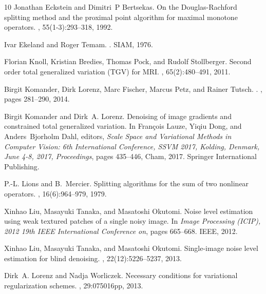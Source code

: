 \documentclass[twocolumn,envcountsame]{svjour3}
\begin{document}
\begin{thebibliography}{10}
Jonathan Eckstein and Dimitri~P Bertsekas.
\newblock On the {D}ouglas-{R}achford splitting method and the proximal point
  algorithm for maximal monotone operators.
, 55(1-3):293--318, 1992.

Ivar Ekeland and Roger Temam.
.
\newblock SIAM, 1976.

Florian Knoll, Kristian Bredies, Thomas Pock, and Rudolf Stollberger.
\newblock Second order total generalized variation ({TGV}) for {MRI}.
, 65(2):480--491, 2011.

Birgit Komander, Dirk Lorenz, Marc Fischer, Marcus Petz, and Rainer Tutsch.
.
, pages 281--290, 2014.

Birgit Komander and Dirk~A. Lorenz.
\newblock Denoising of image gradients and constrained total generalized
  variation.
\newblock In Fran{\c{c}}ois Lauze, Yiqiu Dong, and Anders~Bjorholm Dahl,
  editors, {\em Scale Space and Variational Methods in Computer Vision: 6th
  International Conference, SSVM 2017, Kolding, Denmark, June 4-8, 2017,
  Proceedings}, pages 435--446, Cham, 2017. Springer International Publishing.

P.-L. Lions and B.~Mercier.
\newblock Splitting algorithms for the sum of two nonlinear operators.
, 16(6):964--979, 1979.

Xinhao Liu, Masayuki Tanaka, and Masatoshi Okutomi.
\newblock Noise level estimation using weak textured patches of a single noisy
  image.
\newblock In {\em Image Processing (ICIP), 2012 19th IEEE International
  Conference on}, pages 665--668. IEEE, 2012.

Xinhao Liu, Masayuki Tanaka, and Masatoshi Okutomi.
\newblock Single-image noise level estimation for blind denoising.
, 22(12):5226--5237, 2013.

Dirk~A. Lorenz and Nadja Worliczek.
\newblock Necessary conditions for variational regularization schemes.
, 29:075016pp, 2013.


\end{thebibliography}
\end{document}
